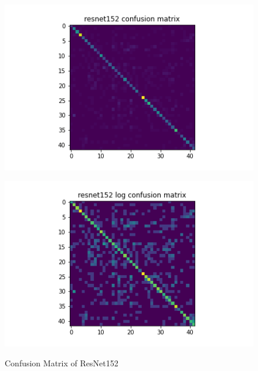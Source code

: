 \begin{figure}[H]
\begin{minipage}[b]{.5\linewidth}
    {\includegraphics[width=1.2\textwidth]{figs/conf_matrix/resnet152_conf.png}}
  \end{minipage}
  \hfill
  \begin{minipage}[b]{.5\linewidth}
    \centering

    {\includegraphics[width=1.2\textwidth]{figs/conf_matrix/resnet152_log_conf.png}}
  \end{minipage}

  \caption{Confusion Matrix of ResNet152}
  \label{fig:resnet152_conf}
  \vspace{0.2in}
\end{figure}

